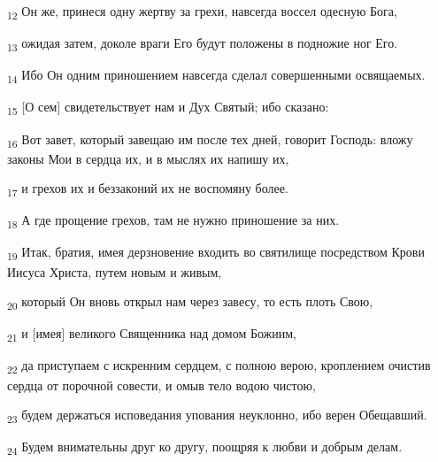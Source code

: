 \begin{tcolorbox}
\textsubscript{12} Он же, принеся одну жертву за грехи, навсегда воссел одесную Бога,
\end{tcolorbox}
\begin{tcolorbox}
\textsubscript{13} ожидая затем, доколе враги Его будут положены в подножие ног Его.
\end{tcolorbox}
\begin{tcolorbox}
\textsubscript{14} Ибо Он одним приношением навсегда сделал совершенными освящаемых.
\end{tcolorbox}
\begin{tcolorbox}
\textsubscript{15} [О сем] свидетельствует нам и Дух Святый; ибо сказано:
\end{tcolorbox}
\begin{tcolorbox}
\textsubscript{16} Вот завет, который завещаю им после тех дней, говорит Господь: вложу законы Мои в сердца их, и в мыслях их напишу их,
\end{tcolorbox}
\begin{tcolorbox}
\textsubscript{17} и грехов их и беззаконий их не воспомяну более.
\end{tcolorbox}
\begin{tcolorbox}
\textsubscript{18} А где прощение грехов, там не нужно приношение за них.
\end{tcolorbox}
\begin{tcolorbox}
\textsubscript{19} Итак, братия, имея дерзновение входить во святилище посредством Крови Иисуса Христа, путем новым и живым,
\end{tcolorbox}
\begin{tcolorbox}
\textsubscript{20} который Он вновь открыл нам через завесу, то есть плоть Свою,
\end{tcolorbox}
\begin{tcolorbox}
\textsubscript{21} и [имея] великого Священника над домом Божиим,
\end{tcolorbox}
\begin{tcolorbox}
\textsubscript{22} да приступаем с искренним сердцем, с полною верою, кроплением очистив сердца от порочной совести, и омыв тело водою чистою,
\end{tcolorbox}
\begin{tcolorbox}
\textsubscript{23} будем держаться исповедания упования неуклонно, ибо верен Обещавший.
\end{tcolorbox}
\begin{tcolorbox}
\textsubscript{24} Будем внимательны друг ко другу, поощряя к любви и добрым делам.
\end{tcolorbox}
